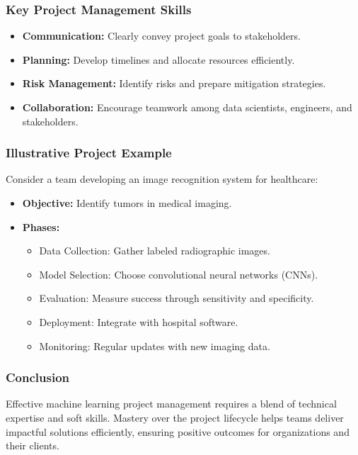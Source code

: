 \documentclass[aspectratio=169]{beamer}
\begin{document}
\begin{frame}[fragile]
    \frametitle{Key Project Management Skills}
    \begin{itemize}
        \item \textbf{Communication:} Clearly convey project goals to stakeholders.
        \item \textbf{Planning:} Develop timelines and allocate resources efficiently.
        \item \textbf{Risk Management:} Identify risks and prepare mitigation strategies.
        \item \textbf{Collaboration:} Encourage teamwork among data scientists, engineers, and stakeholders.
    \end{itemize}
\end{frame}

\begin{frame}[fragile]
    \frametitle{Illustrative Project Example}
    Consider a team developing an image recognition system for healthcare:
    \begin{itemize}
        \item \textbf{Objective:} Identify tumors in medical imaging.
        \item \textbf{Phases:}
            \begin{itemize}
                \item Data Collection: Gather labeled radiographic images.
                \item Model Selection: Choose convolutional neural networks (CNNs).
                \item Evaluation: Measure success through sensitivity and specificity.
                \item Deployment: Integrate with hospital software.
                \item Monitoring: Regular updates with new imaging data.
            \end{itemize}
    \end{itemize}
\end{frame}

\begin{frame}[fragile]
    \frametitle{Conclusion}
    Effective machine learning project management requires a blend of technical expertise and soft skills. Mastery over the project lifecycle helps teams deliver impactful solutions efficiently, ensuring positive outcomes for organizations and their clients.
\end{frame}
\end{document}
